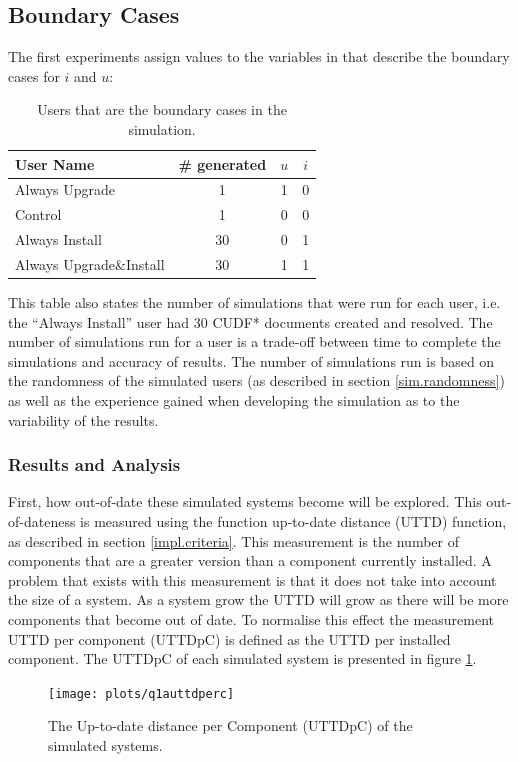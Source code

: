 \subsection{Boundary Cases}
The first experiments assign values to the variables in \usermodel that describe the boundary cases for $i$ and $u$:
\begin{table}[h!]
\centering
\begin{tabular}{|l | c | c | c }
\hline
User Name 				 	& \# generated 	& $u$ 		& $i$ 			\\ \hline
Always Upgrade				& 1 			&1			& 0				 \\
Control						& 1 			& 0			& 0				\\
Always Install 				& 30 			& 0			& 1				 \\
Always Upgrade\&Install 	& 30 			&1			& 1				\\
\end{tabular}
\caption{Users that are the boundary cases in the simulation.}
\label{exp.extremeusers}
\end{table}
This table also states the number of simulations that were run for each user, i.e. the ``Always Install'' user had 30 CUDF* documents created and resolved.
The number of simulations run for a user is a trade-off between time to complete the simulations and accuracy of results.
The number of simulations run is based on the randomness of the simulated users (as described in section \ref{sim.randomness}) 
as well as the experience gained when developing the simulation as to the variability of the results.

\subsubsection{Results and Analysis}
First, how out-of-date these simulated systems become will be explored.
This out-of-dateness is measured using the function up-to-date distance (UTTD) function, as described in section \ref{impl.criteria}.
This measurement is the number of components that are a greater version than a component currently installed.
A problem that exists with this measurement is that it does not take into account the size of a system.
As a system grow the UTTD will grow as there will be more components that become out of date.
To normalise this effect the measurement UTTD per component (UTTDpC) is defined as the UTTD per installed component.
The UTTDpC of each simulated system is presented in figure \ref{exp.q1auttdpc}.
\begin{figure}[htp]
\begin{center}
  \texttt{[image: plots/q1auttdperc]}
  \caption{The Up-to-date distance per Component (UTTDpC) of the simulated systems.}
  \label{exp.q1auttdpc}
\end{center}
\end{figure}

